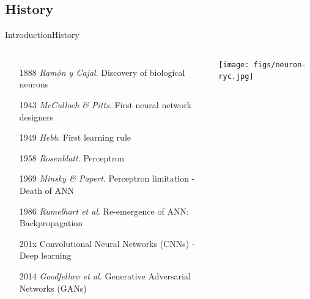 \documentclass[10pt,compress]{beamer} %
\begin{document}
\subsection{History}
\begin{frame}{Introduction}{History}
    \begin{columns}

	\begin{itemize}
	\item[1888] \textit{Ramón y Cajal}. Discovery of biological neurons
	\item[1943] \textit{McCulloch \& Pitts}. First neural network designers
	\item[1949] \textit{Hebb}. First learning rule
	\item[1958] \textit{Rosenblatt}. Perceptron
	\item[1969] \textit{Minsky \& Papert}.  Perceptron limitation - Death of ANN
	\item[1986] \textit{Rumelhart et al}. Re-emergence of ANN: Backpropagation
	\item[201x] Convolutional Neural Networks (CNNs) - Deep learning
	\item[2014] \textit{Goodfellow et al.} Generative Adversarial Networks (GANs)
	\end{itemize}

		\texttt{[image: figs/neuron-ryc.jpg]}
	   \end{columns}
\end{frame}
\end{document}
